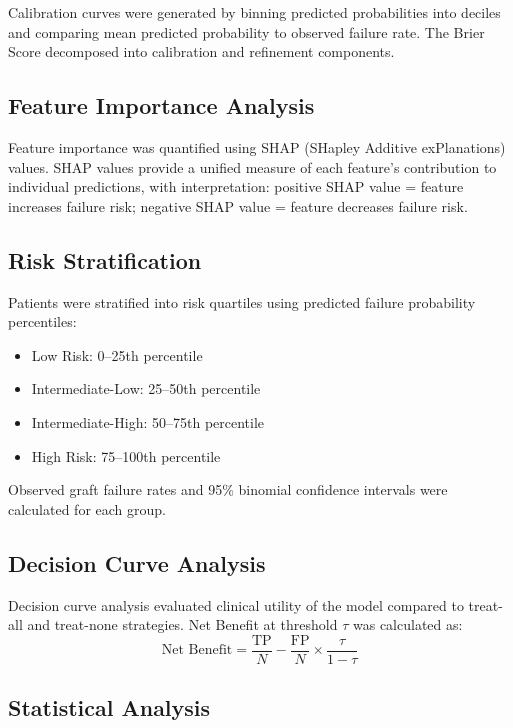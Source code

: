 \documentclass[11pt,a4paper]{article}
\begin{document}
Calibration curves were generated by binning predicted probabilities into deciles and comparing mean predicted probability to observed failure rate. The Brier Score decomposed into calibration and refinement components.

\subsection{Feature Importance Analysis}

Feature importance was quantified using SHAP (SHapley Additive exPlanations) values.\cite{Lundberg2017} SHAP values provide a unified measure of each feature's contribution to individual predictions, with interpretation: positive SHAP value = feature increases failure risk; negative SHAP value = feature decreases failure risk.

\subsection{Risk Stratification}

Patients were stratified into risk quartiles using predicted failure probability percentiles:
\begin{itemize}
    \item Low Risk: 0–25th percentile
    \item Intermediate-Low: 25–50th percentile
    \item Intermediate-High: 50–75th percentile
    \item High Risk: 75–100th percentile
\end{itemize}

Observed graft failure rates and 95\% binomial confidence intervals were calculated for each group.

\subsection{Decision Curve Analysis}

Decision curve analysis evaluated clinical utility of the model compared to treat-all and treat-none strategies. Net Benefit at threshold $\tau$ was calculated as:
\begin{equation}
\text{Net Benefit} = \frac{\text{TP}}{N} - \frac{\text{FP}}{N} \times \frac{\tau}{1-\tau}
\end{equation}

\subsection{Statistical Analysis}
\end{document}
